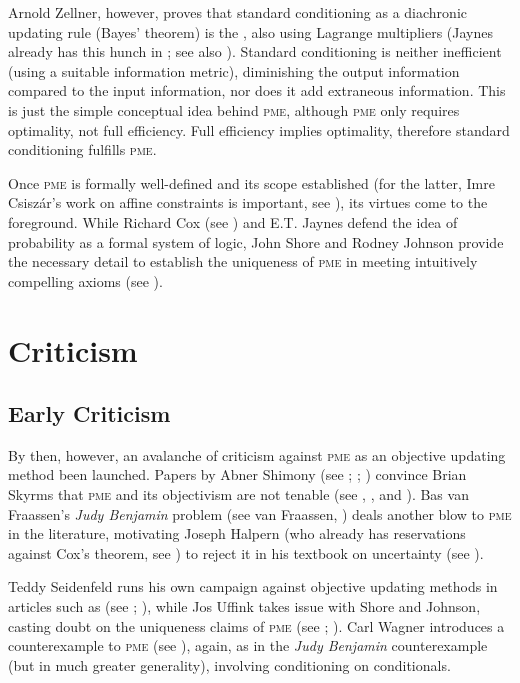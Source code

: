 \documentclass[phd,12pt,oneside]{ubcthesis}
\begin{document}
Arnold Zellner, however, proves that standard conditioning as a
diachronic updating rule (Bayes' theorem) is the  , also using
Lagrange multipliers (Jaynes already has this hunch in
; see also ).
Standard conditioning is neither inefficient (using a suitable
information metric), diminishing the output information compared to
the input information, nor does it add extraneous information. This is
just the simple conceptual idea behind \textsc{pme}, although
\textsc{pme} only requires optimality, not full efficiency. Full
efficiency implies optimality, therefore standard conditioning
fulfills \textsc{pme}.

Once \textsc{pme} is formally well-defined and its scope
established (for the latter, Imre Csisz{\'a}r's work on affine
constraints is important, see ), its virtues
come to the foreground. While Richard Cox (see ) and
E.T. Jaynes defend the idea of probability as a formal system of
logic, John Shore and Rodney Johnson provide the necessary detail to
establish the uniqueness of \textsc{pme} in meeting intuitively
compelling axioms (see ).

\section{Criticism}
\label{sec:iejikoov}

\subsection{Early Criticism}
\label{subsec:phopheil}

By then, however, an avalanche of criticism against \textsc{pme} as an
objective updating method been launched. Papers by Abner Shimony (see
; ;
) convince Brian Skyrms that \textsc{pme} and
its objectivism are not tenable (see ,
, and ). Bas van
Fraassen's \emph{Judy Benjamin} problem (see van Fraassen,
) deals another blow to \textsc{pme} in the
literature, motivating Joseph Halpern (who already has reservations
against Cox's theorem, see ) to reject it in his
textbook on uncertainty (see ).

Teddy Seidenfeld runs his own campaign against objective updating
methods in articles such as 
(see ; ), while Jos
Uffink takes issue with Shore and Johnson, casting doubt on the
uniqueness claims of \textsc{pme} (see ;
). Carl Wagner introduces a counterexample to
\textsc{pme} (see ), again, as in the \emph{Judy
Benjamin} counterexample (but in much greater generality), involving
conditioning on conditionals.
\end{document}
